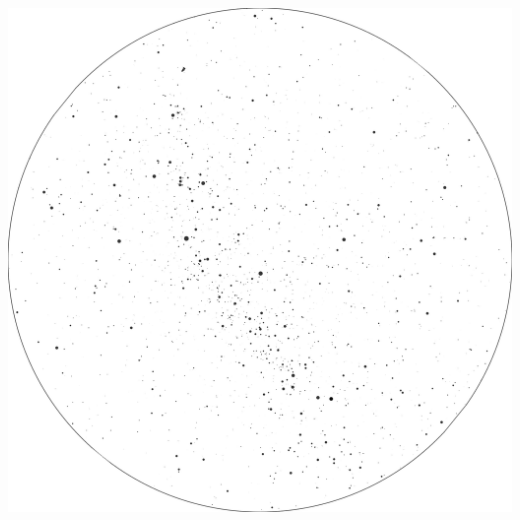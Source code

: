 \documentclass{./SAS-class-skygen}
\begin{document}
	\vspace{0.5cm}
    \begin{center}
    \includegraphics[width=\textwidth]{./pics/skychart56.png}
    \end{center}
    
    
\end{document}

